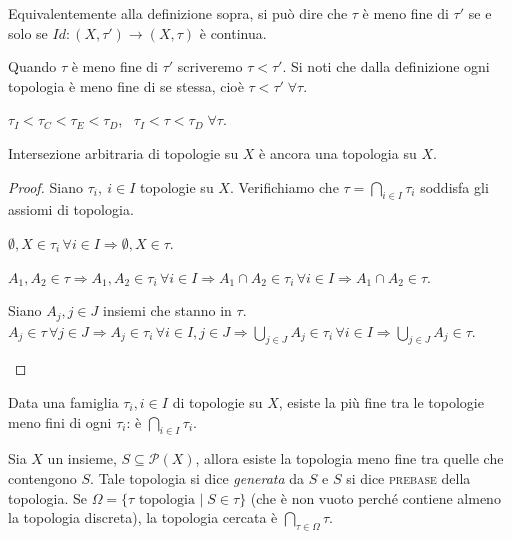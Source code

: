 \documentclass{article}
\begin{document}
\begin{oss}
Equivalentemente alla definizione sopra, si pu\`o dire che $\tau$ \`e meno fine
di $\tau'$ se e solo se ${Id:(X,\tau')\rightarrow(X, \tau)}$ \`e continua.
\end{oss}

Quando $\tau$ è meno fine di $\tau'$ scriveremo $\tau < \tau'$. Si noti che
dalla definizione ogni topologia è meno fine di se stessa, cioè $\tau < \tau'
\; \forall \tau$.

\begin{ex}
	$\tau_I < \tau_C < \tau_E < \tau_D$, \, $\tau_I < \tau < \tau_D \; \forall
	\tau$.
\end{ex}

\begin{lm}
	Intersezione arbitraria di topologie su $X$ è ancora una topologia su $X$.
\end{lm}

\begin{proof}
Siano $\tau_i,\ i \in I$ topologie su $X$.
Verifichiamo che $ \tau=\bigcap_{i \in I} \tau_i$ soddisfa gli assiomi di
topologia.

\begin{nlist}
\item $\emptyset, X \in \tau_i \, \forall i \in I \Rightarrow \emptyset, X \in
\tau$.
\item $A_1, A_2 \in \tau \Rightarrow A_1, A_2 \in \tau_i \, \forall i
\in I \Rightarrow A_1 \cap A_2 \in \tau_i \, \forall i \in I \Rightarrow A_1
\cap A_2 \in \tau$.
\item Siano $A_j, j \in J$ insiemi che stanno in $\tau$. \\
$\displaystyle A_j \in \tau \, \forall j \in J \Rightarrow A_j \in \tau_i \,
\forall i \in I, j \in J \Rightarrow {\bigcup_{j \in J} A_j \in \tau_i \,
\forall i \in I} \Rightarrow {\bigcup_{j \in J} A_j \in \tau}$.
\end{nlist}
\end{proof}

\begin{cor}
	Data una famiglia $\tau_i, i \in I$ di topologie su $X$, esiste la più fine
	tra le topologie meno fini di ogni $\tau_i$: è $\displaystyle \bigcap_{i \in
	I} \tau_i$.
\end{cor}

\begin{cor}
	Sia $X$ un insieme, $S \subseteq \mathcal{P}(X)$, allora esiste la topologia
	meno fine tra quelle che contengono $S$. Tale topologia si dice
	\textit{generata} da $S$ e $S$ si dice \textsc{prebase} della topologia. Se
	$\Omega= \{ \tau \text{ topologia } |\; S \in \tau \}$ (che è non vuoto
	perché contiene almeno la topologia discreta), la topologia cercata è
	$\displaystyle \bigcap_{\tau \in \Omega} \tau$.
\end{cor}
\end{document}
